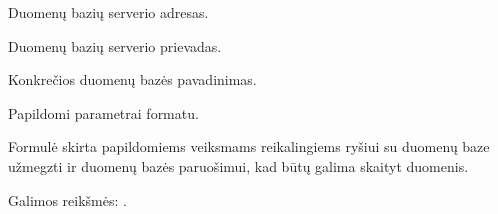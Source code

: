 \documentclass[letterpaper,10pt,lithuanian]{sphinxmanual}
\begin{document}
\begin{fulllineitems}
\begin{fulllineitems}
\end{fulllineitems}



\begin{fulllineitems}

\pysigstartsignatures
\pysigline
{}
\pysigstopsignatures
\sphinxAtStartPar
Duomenų bazių serverio adresas.

\end{fulllineitems}



\begin{fulllineitems}

\pysigstartsignatures
\pysigline
{}
\pysigstopsignatures
\sphinxAtStartPar
Duomenų bazių serverio prievadas.

\end{fulllineitems}



\begin{fulllineitems}

\pysigstartsignatures
\pysigline
{}
\pysigstopsignatures
\sphinxAtStartPar
Konkrečios duomenų bazės pavadinimas.

\end{fulllineitems}



\begin{fulllineitems}

\pysigstartsignatures
\pysigline
{}
\pysigstopsignatures
\sphinxAtStartPar
Papildomi parametrai  formatu.

\end{fulllineitems}


\end{fulllineitems}



\begin{fulllineitems}

\pysigstartsignatures
\pysigline
{}
\pysigstopsignatures
\sphinxAtStartPar
Formulė skirta papildomiems veiksmams reikalingiems ryšiui su duomenų baze
užmegzti ir duomenų bazės paruošimui, kad būtų galima skaityt duomenis.

\end{fulllineitems}



\begin{fulllineitems}

\pysigstartsignatures
\pysigline
{}
\pysigstopsignatures
\sphinxAtStartPar
Galimos reikšmės: .

\end{fulllineitems}
\end{document}
